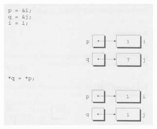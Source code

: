 \documentclass[12pt]{article}
\begin{document}
\begin{enumerate}[1.]
\begin{itemize}
\begin{itemize}
            \begin{center}
            \includegraphics[width=0.6\linewidth]{images/review_4_solution_4.png}
            \end{center}

        \end{itemize}
    \end{itemize}
\end{enumerate}
\end{document}
